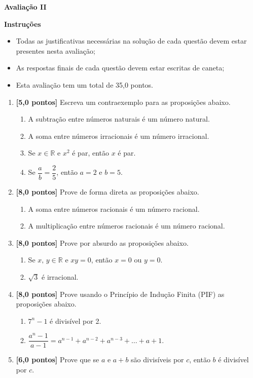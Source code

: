 \documentclass[12pt,a4paper]{article}
\begin{document}
\begin{center}
 \textbf{Avaliação II}
\end{center}

\textbf{Instruções}
\begin{itemize}
 \item Todas as justificativas necessárias na solução de cada questão devem estar presentes nesta avaliação;
 \item As respostas finais de cada questão devem estar escritas de caneta;
 \item Esta avaliação tem um total de 35,0 pontos.
\end{itemize}

\begin{enumerate}
  \item \textbf{[5,0 pontos]} Escreva um contraexemplo para as proposições abaixo.
  \begin{enumerate}
    \item A subtração entre números naturais é um número natural.
    \item A soma entre números irracionais é um número irracional.
    \item Se $x\in\mathbb{R}$ e $x^2$ é par, então $x$ é par.
    \item Se $\dfrac{a}{b} = \dfrac{2}{5}$, então $a = 2$ e $b = 5$.
  \end{enumerate}
  
  \item \textbf{[8,0 pontos]} Prove de forma direta as proposições abaixo.
  \begin{enumerate}
    \item A soma entre números racionais é um número racional.
    \item A multiplicação entre números racionais é um número racional.
  \end{enumerate}
  
  \item \textbf{[8,0 pontos]} Prove por absurdo as proposições abaixo.
  \begin{enumerate}
    \item Se $x,\,y\in\mathbb{R}$ e $xy = 0$, então $x = 0$ ou $y = 0$.
    \item $\sqrt{3}$ é irracional.
  \end{enumerate}

  \item \textbf{[8,0 pontos]} Prove usando o Princípio de Indução Finita (PIF) as proposições abaixo.
  \begin{enumerate}
    \item $7^n - 1$ é divisível por 2.
    \item $\dfrac{a^n - 1}{a - 1} = a^{n - 1} + a^{n - 2} + a^{n - 3} + \ldots + a + 1$.
  \end{enumerate}

  \item \textbf{[6,0 pontos]} Prove que se $a$ e $a + b$ são divisíveis por $c$, então $b$ é divisível 
  por $c$.

\end{enumerate}
\end{document}
